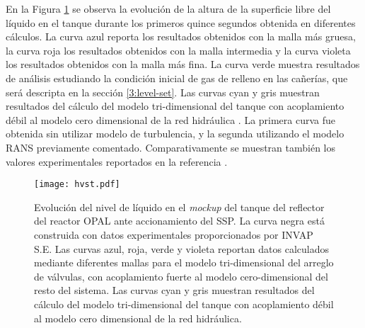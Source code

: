 
En la Figura \ref{hvst} se observa la evolución de la altura de la superficie libre del líquido en el tanque durante los primeros quince segundos obtenida en diferentes cálculos.
La curva azul reporta los resultados obtenidos con la malla más gruesa, la curva roja los resultados obtenidos con la malla intermedia y la curva violeta los resultados obtenidos con la malla más fina.
La curva verde muestra resultados de análisis estudiando la condición inicial de gas de relleno en las cañerías, que será descripta en la sección \ref{3:level-set}.
Las curvas cyan y gris muestran resultados del cálculo del modelo tri-dimensional del tanque con acoplamiento débil al modelo cero dimensional de la red hidráulica \cite{ra10-paper}.
La primera curva fue obtenida sin utilizar modelo de turbulencia, y la segunda utilizando el modelo RANS previamente comentado.
Comparativamente se muestran también los valores experimentales reportados en la referencia \cite{invap-mockup}.

\begin{figure}[ht]
\centering
\texttt{[image: hvst.pdf]}
\caption[Evolución del nivel de líquido en el \textit{mockup} del tanque del reflector del reactor OPAL ante accionamiento del SSP]
{Evolución del nivel de líquido en el \textit{mockup} del tanque del reflector del reactor OPAL ante accionamiento del SSP.
La curva negra está construida con datos experimentales proporcionados por INVAP S.E.
Las curvas azul, roja, verde y violeta reportan datos calculados mediante diferentes mallas para el modelo tri-dimensional del arreglo de válvulas, 
con acoplamiento fuerte al modelo cero-dimensional del resto del sistema.
Las curvas cyan y gris muestran resultados del cálculo del modelo tri-dimensional del tanque con acoplamiento débil al modelo cero dimensional de la red hidráulica.}
\label{hvst} 
\end{figure}

